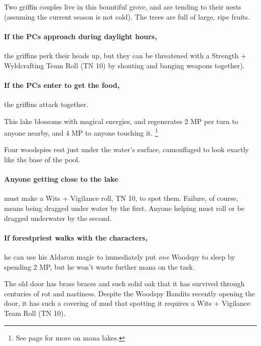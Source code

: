 \begin{multicols}{2}
Two griffin couples live in this bountiful grove, and are tending to their nests (assuming the current season is not cold).
The trees are full of large, ripe fruits.


\paragraph{If the PCs approach during daylight hours,}
the griffins perk their heads up, but they can be threatened with a Strength + Wyldcrafting Team Roll (TN 10) by shouting and banging weapons together).

\paragraph{If the PCs enter to get the food,}
the griffins attack together.


This lake blossoms with magical energies, and regenerates 2 MP per turn to anyone nearby, and 4 MP to anyone touching it.%
\footnote{See page \pageref{mana_lake} for more on mana lakes.}

Four woodspies rest just under the water's surface, camouflaged to look exactly like the base of the pool.

\paragraph{Anyone getting close to the lake}
must make a Wits + Vigilance roll, TN 10, to spot them.
Failure, of course, means being dragged under water by the first.
Anyone helping must roll or be dragged underwater by the second.

\paragraph{If \gls{forestpriest} walks with the characters,}
he can use his Aldaron magic to immediately put \emph{one} Woodspy to sleep by spending 2 MP, but he won't waste further mana on the task.


The old door has brass braces and such solid oak that it has survived through centuries of rot and nastiness.
Despite the Woodspy Bandits recently opening the door, it has such a covering of mud that spotting it requires a Wits + Vigilance Team Roll (TN 10).


\end{multicols}
